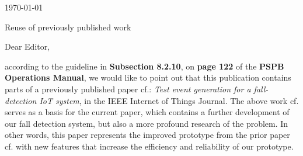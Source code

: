 \documentclass[parskip]{scrartcl}
\begin{document}
 
\pagestyle{empty}

\begin{flushright}
    \Large
    \today
\end{flushright}

\begin{center}
    \huge
    Reuse of previously published work \\
    \vspace{0.4cm}

\end{center}
 
    \vspace{0.8cm}

    \normalsize

Dear Editor,

according to the guideline in \textbf{Subsection 8.2.10}, on \textbf{page 122} of the \textbf{PSPB Operations Manual}, we would like to point out that this publication contains parts of a previously published paper cf.\cite{LorenaFall}: \textit{Test event generation for a fall-detection IoT system}, in the IEEE Internet of Things Journal. The above work cf.\cite{LorenaFall} serves as a basis for the current paper, which contains a further development of our fall detection system, but also a more profound research of the problem. In other words, this paper represents the improved prototype from the prior paper cf.\cite{LorenaFall} with new features that increase the efficiency and reliability of our prototype.
\end{document}

